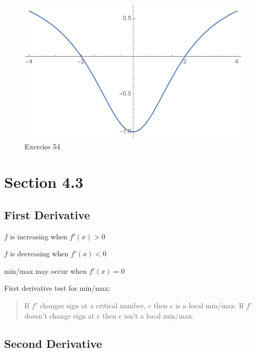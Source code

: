 \documentclass[letterpaper, landscape]{exam}
\begin{document}
\begin{description}
\begin{solution}
        \begin{figure}[H]
          \centering
          \includegraphics[scale = 0.6]{ex41_54.pdf}
        \caption{Exercise 54}
        \label{fig:ex41_54}
        \end{figure}
      \end{solution}

  \end{description}

  \section{Section 4.3} %
  
  \subsection{First Derivative} %
  
  \begin{itemize*}
    \item $f$ is increasing when $f'(x) > 0$
    \item $f$ is decreasing when $f'(x) < 0$
    \item min/max may occur when $f'(x) = 0$
  \end{itemize*}

  First derivative test for min/max:

  \begin{quote}
    If $f'$ changes sign at a critical number, $c$ then $c$ is a local min/max. If $f'$ doesn't change
    sign at $c$ then $c$ isn't a local min/max.
  \end{quote}

  \subsection{Second Derivative} %
  
\end{document}
